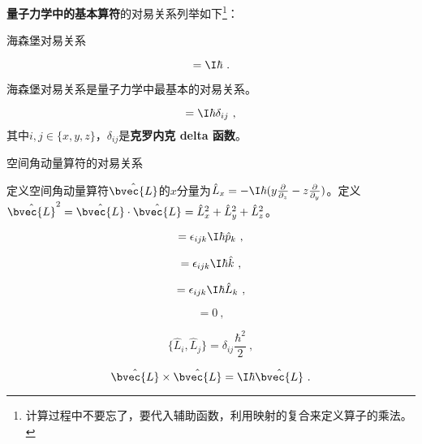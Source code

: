 \textbf{量子力学中的基本算符}的对易关系列举如下\footnote{计算过程中不要忘了，要代入辅助函数，利用映射的复合来定义算子的乘法。}：

\begin{theorem}{海森堡对易关系}\label{the_ComOpQ_5}

\begin{equation}
[\hat{x}, \hat{p}_x] = \I\hbar~.
\end{equation}

\end{theorem}



海森堡对易关系是量子力学中最基本的对易关系。



\begin{corollary}{}\label{cor_ComOpQ_1}

\begin{equation}
[\hat{i}, \hat{p}_j]=\I\hbar\delta_{ij}~,
\end{equation}
其中$i, j\in\{x, y, z\}$，$\delta_{ij}$是\textbf{克罗内克 delta 函数}。
\end{corollary}

\begin{theorem}{空间角动量算符的对易关系}\label{the_ComOpQ_6}

定义空间角动量算符$\hat{\bvec{L}}$的$x$分量为$\hat{L}_x=-\I\hbar(y\frac{\partial}{\partial_z}-z\frac{\partial}{\partial _y})$。定义$\hat{\bvec{L}}^2=\hat{\bvec{L}}\cdot \hat{\bvec{L}}=\hat{L}_x^2+\hat{L}_y^2+\hat{L}_z^2$。


\begin{equation}
[\hat{p}_i, \hat{L}_j]=\epsilon_{ijk}\I\hbar\hat{p}_k~,
\end{equation}


\begin{equation}
[\hat{i}, \hat{L}_j]=\epsilon_{ijk}\I\hbar\hat{k}~,
\end{equation}



\begin{equation}
[\hat{L}_i, \hat{L}_j]=\epsilon_{ijk}\I\hbar\hat{L}_k~,
\end{equation}

\begin{equation}
[\hat{\bvec{L}}^2, \hat{L}_i]=0~,
\end{equation}

\begin{equation}
\{\hat{L}_i, \hat{L}_j\}=\delta_{ij}\frac{\hbar^2}{2}~,
\end{equation}

\begin{equation}
\hat{\bvec{L}}\times\hat{\bvec{L}}=\I\hbar \hat{\bvec{L}}~.
\end{equation}

\end{theorem}




